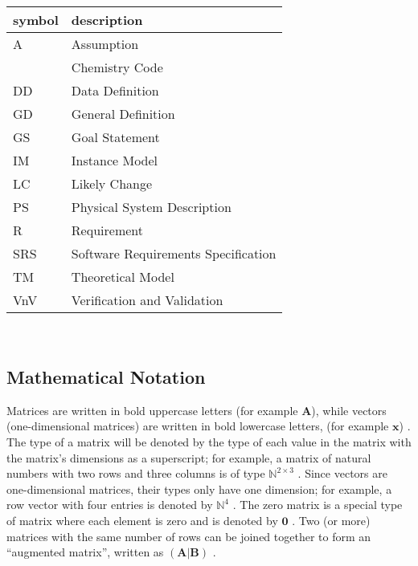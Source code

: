 \documentclass[12pt]{article}
\begin{document}
\renewcommand{\arraystretch}{1.2}
\begin{tabular}{l l}
  \toprule
  \textbf{symbol} & \textbf{description}                \\
  \midrule
  A               & Assumption                          \\
  \progname{}     & Chemistry Code                      \\
  DD              & Data Definition                     \\
  GD              & General Definition                  \\
  GS              & Goal Statement                      \\
  IM              & Instance Model                      \\
  LC              & Likely Change                       \\
  PS              & Physical System Description         \\
  R               & Requirement                         \\
  SRS             & Software Requirements Specification \\
  TM              & Theoretical Model                   \\
  VnV             & Verification and Validation         \\
  \bottomrule
\end{tabular}\\

\subsection{Mathematical Notation} \label{sec_mathNot}

Matrices are written in bold uppercase letters (for example $\textbf{A}$), while
vectors (one-dimensional matrices) are written in bold lowercase letters, (for
example
$\textbf{x}$) \cite{osullivan_appendix_2010}. The type of a matrix will be
denoted by the type of each value in the matrix with the matrix's dimensions
as a superscript; for example, a matrix of natural numbers with two rows and
three columns is of type $\mathbb{N}^{2 \times 3}$
\cite[p.~3]{golub_matrix_2013}. Since vectors are one-dimensional
matrices, their types only have one dimension; for example, a row vector with
four entries is denoted by $\mathbb{N}^{4}$ \cite[p.~4]{golub_matrix_2013}.
The zero matrix is a special
type of matrix where each element is zero and is denoted by $\textbf{0}$
\cite{weisstein_zero_2023}.
Two (or more) matrices with the same
number of rows can be joined together to form an ``augmented matrix'', written
as $\left(\textbf{A}\vert \textbf{B}\right)$ \cite{taboga_augmented_2021}.
\end{document}
